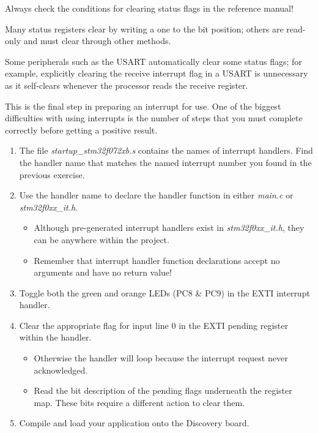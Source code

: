 \documentclass[11pt,fleqn]{book} %
\begin{document}
\begin{warning}
    Always check the conditions for clearing status flags in the reference manual!
    
    Many status registers clear by writing a one to the bit position; others are read-only and must clear through other methods. 
    
    Some peripherals such as the USART automatically clear some status flags; for example, explicitly clearing the receive interrupt flag in a USART is unnecessary as it self-clears whenever the processor reads the receive register. 
\end{warning}

\begin{exercise}
    \label{ex5}
    This is the final step in preparing an interrupt for use. One of the biggest difficulties with using interrupts is the number of steps that you must complete correctly before getting a positive result.
    
    \begin{enumerate}
        \item The file \textit{startup\_stm32f072xb.s} contains the names of interrupt handlers. Find the handler name that matches the named interrupt number you found in the previous exercise. 
        \item Use the handler name to declare the handler function in either \textit{main.c} or \textit{stm32f0xx\_it.h}.
        \begin{itemize}
            \item Although pre-generated interrupt handlers exist in \textit{stm32f0xx\_it.h}, they can be anywhere within the project. 
            \item Remember that interrupt handler function declarations accept no arguments and have no return value! 
        \end{itemize}
        \item Toggle both the green and orange LEDs (PC8 \& PC9) in the EXTI interrupt handler. 
        \item Clear the appropriate flag for input line 0 in the EXTI pending register within the handler.
        \begin{itemize}
            \item Otherwise the handler will loop because the interrupt request never acknowledged.
            \item Read the bit description of the pending flags underneath the register map. These bits require a different action to clear them.
        \end{itemize}
        \item Compile and load your application onto the Discovery board.
    \end{enumerate}
    

\end{exercise}
\end{document}
